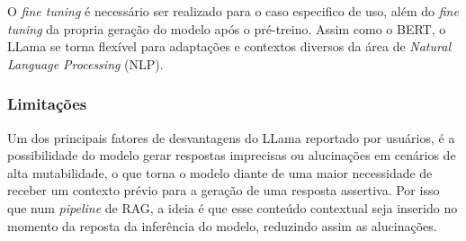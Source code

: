 O \textit{fine tuning} é necessário ser realizado para o caso especifico de uso, além do \textit{fine tuning} da propria geração do modelo após o pré-treino. Assim como o BERT, o LLama se torna flexível para adaptações e contextos diversos da área de \textit{Natural Language Processing} (NLP).

\subsubsection{Limitações}
Um dos principais fatores de desvantagens do LLama reportado por usuários, é a possibilidade do modelo gerar respostas imprecisas ou alucinações em cenários de alta mutabilidade, o que torna o modelo diante de uma maior necessidade de receber um contexto prévio para a geração de uma resposta assertiva. Por isso que num \textit{pipeline} de RAG, a ideia é que esse conteúdo contextual seja inserido no momento da reposta da inferência do modelo, reduzindo assim as alucinações.

